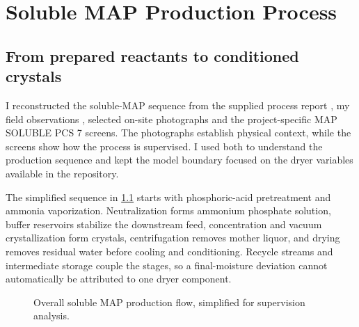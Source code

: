 \chapter{Soluble MAP Production Process}
\label{chap:process}

\section{From prepared reactants to conditioned crystals}

I reconstructed the soluble-MAP sequence from the supplied process report \cite{souilmi}, my field observations \cite{fieldnotes}, selected on-site photographs and the project-specific MAP SOLUBLE PCS 7 screens. The photographs establish physical context, while the screens show how the process is supervised. I used both to understand the production sequence and kept the model boundary focused on the dryer variables available in the repository.

The simplified sequence in \cref{fig:mapflow} starts with phosphoric-acid pretreatment and ammonia vaporization. Neutralization forms ammonium phosphate solution, buffer reservoirs stabilize the downstream feed, concentration and vacuum crystallization form crystals, centrifugation removes mother liquor, and drying removes residual water before cooling and conditioning. Recycle streams and intermediate storage couple the stages, so a final-moisture deviation cannot automatically be attributed to one dryer component.

\begin{figure}[ht]
\centering
{}
\caption{Overall soluble MAP production flow, simplified for supervision analysis.}
\label{fig:mapflow}
\end{figure}

